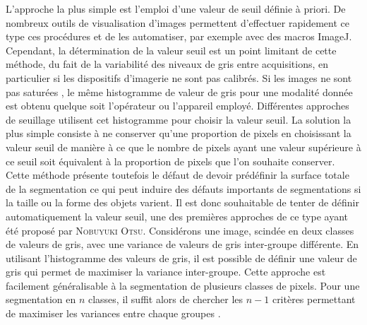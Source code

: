 \documentclass[\main/main.tex]{subfiles}
\begin{document}
L'approche la plus simple est l'emploi d'une valeur de seuil définie à priori\cite{hinfray_2018}.
%
De nombreux outils de visualisation d'images permettent d'effectuer rapidement ce type ces procédures et de les automatiser, par exemple avec des macros ImageJ.
%
Cependant, la détermination de la valeur seuil est un point limitant de cette méthode, du fait de la variabilité des niveaux de gris entre acquisitions, en particulier si les dispositifs d'imagerie ne sont pas calibrés.
%
Si les images ne sont pas saturées , le même histogramme de valeur de gris pour une modalité donnée est obtenu quelque soit l'opérateur ou l'appareil employé.
%
Différentes approches de seuillage utilisent cet histogramme pour choisir la valeur seuil.
%
La solution la plus simple consiste à ne conserver qu'une proportion de pixels en choisissant la valeur seuil de manière à ce que le nombre de pixels ayant une valeur supérieure à ce seuil soit équivalent à la proportion de pixels que l'on souhaite conserver.
%
Cette méthode présente toutefois le défaut de devoir prédéfinir la surface totale de la segmentation ce qui peut induire des défauts importants de segmentations si la taille ou la forme des objets varient.
%
Il est donc souhaitable de tenter de définir automatiquement la valeur seuil, une des premières approches de ce type ayant été proposé par \textsc{Nobuyuki Otsu}\cite{otsu_1979}.
%
Considérons une image, scindée en deux classes de valeurs de gris, avec une variance de valeurs de gris inter\hyp{}groupe différente. En utilisant l'histogramme des valeurs de gris, il est possible de définir une valeur de gris qui permet de maximiser la variance inter\hyp{}groupe.
%
Cette approche est facilement généralisable à la segmentation de plusieurs classes de pixels. Pour une segmentation en $n$ classes, il suffit alors de chercher les $n-1$ critères permettant de maximiser les variances entre chaque groupes \cite{kugler_2019,ibrahim_2020,huang_2020}.
\end{document}
